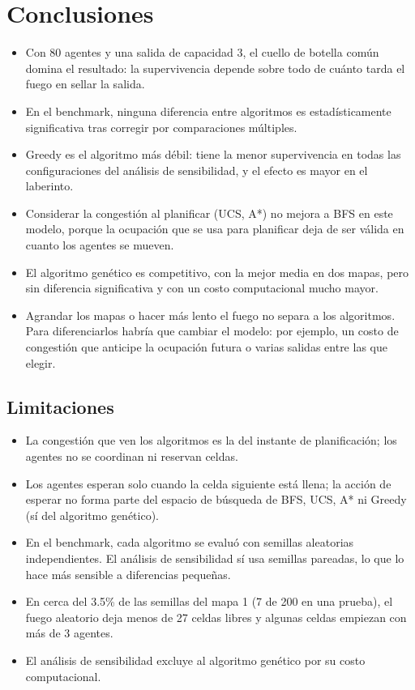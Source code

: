 \documentclass[11pt,a4paper]{article}
\begin{document}
\section{Conclusiones}

\begin{itemize}
  \item Con 80 agentes y una salida de capacidad 3, el cuello de botella común domina el resultado: la supervivencia depende sobre todo de cuánto tarda el fuego en sellar la salida.
  \item En el benchmark, ninguna diferencia entre algoritmos es estadísticamente significativa tras corregir por comparaciones múltiples.
  \item Greedy es el algoritmo más débil: tiene la menor supervivencia en todas las configuraciones del análisis de sensibilidad, y el efecto es mayor en el laberinto.
  \item Considerar la congestión al planificar (UCS, A*) no mejora a BFS en este modelo, porque la ocupación que se usa para planificar deja de ser válida en cuanto los agentes se mueven.
  \item El algoritmo genético es competitivo, con la mejor media en dos mapas, pero sin diferencia significativa y con un costo computacional mucho mayor.
  \item Agrandar los mapas o hacer más lento el fuego no separa a los algoritmos. Para diferenciarlos habría que cambiar el modelo: por ejemplo, un costo de congestión que anticipe la ocupación futura o varias salidas entre las que elegir.
\end{itemize}

\subsection{Limitaciones}

\begin{itemize}
  \item La congestión que ven los algoritmos es la del instante de planificación; los agentes no se coordinan ni reservan celdas.
  \item Los agentes esperan solo cuando la celda siguiente está llena; la acción de esperar no forma parte del espacio de búsqueda de BFS, UCS, A* ni Greedy (sí del algoritmo genético).
  \item En el benchmark, cada algoritmo se evaluó con semillas aleatorias independientes. El análisis de sensibilidad sí usa semillas pareadas, lo que lo hace más sensible a diferencias pequeñas.
  \item En cerca del 3.5\% de las semillas del mapa 1 (7 de 200 en una prueba), el fuego aleatorio deja menos de 27 celdas libres y algunas celdas empiezan con más de 3 agentes.
  \item El análisis de sensibilidad excluye al algoritmo genético por su costo computacional.
\end{itemize}
\end{document}
